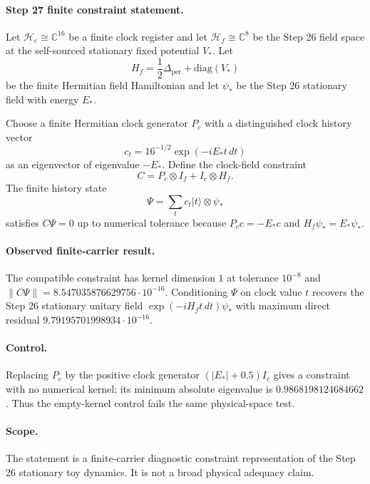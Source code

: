 \paragraph{Step 27 finite constraint statement.}
Let \(\mathcal{H}_c \cong \mathbb{C}^{16}\) be a finite clock register and
let \(\mathcal{H}_f \cong \mathbb{C}^{8}\) be the Step 26 field space at the
self-sourced stationary fixed potential \(V_\ast\).  Let
\[
H_f = \frac12 \Delta_{\mathrm{per}} + \mathrm{diag}(V_\ast)
\]
be the finite Hermitian field Hamiltonian and let \(\psi_\ast\) be the Step
26 stationary field with energy \(E_\ast\).

Choose a finite Hermitian clock generator \(P_c\) with a distinguished clock
history vector
\[
c_t = 16^{-1/2}\exp(-iE_\ast t\,dt)
\]
as an eigenvector of eigenvalue \(-E_\ast\).  Define the clock-field
constraint
\[
C = P_c \otimes I_f + I_c \otimes H_f.
\]
The finite history state
\[
\Psi = \sum_t c_t |t\rangle \otimes \psi_\ast
\]
satisfies \(C\Psi=0\) up to numerical tolerance because
\(P_c c=-E_\ast c\) and \(H_f\psi_\ast=E_\ast\psi_\ast\).

\paragraph{Observed finite-carrier result.}
The compatible constraint has kernel dimension \(1\) at tolerance \(10^{-8}\)
and \(\|C\Psi\|=8.547035876629756\cdot 10^{-16}\).  Conditioning \(\Psi\)
on clock value \(t\) recovers the Step 26 stationary unitary field
\(\exp(-iH_f t\,dt)\psi_\ast\) with maximum direct residual
\(9.79195701998934\cdot 10^{-16}\).

\paragraph{Control.}
Replacing \(P_c\) by the positive clock generator
\((|E_\ast|+0.5)I_c\) gives a constraint with no numerical kernel; its
minimum absolute eigenvalue is \(0.9868198124684662\).  Thus the
empty-kernel control fails the same physical-space test.

\paragraph{Scope.}
The statement is a finite-carrier diagnostic constraint representation of
the Step 26 stationary toy dynamics.  It is not a broad physical adequacy
claim.
